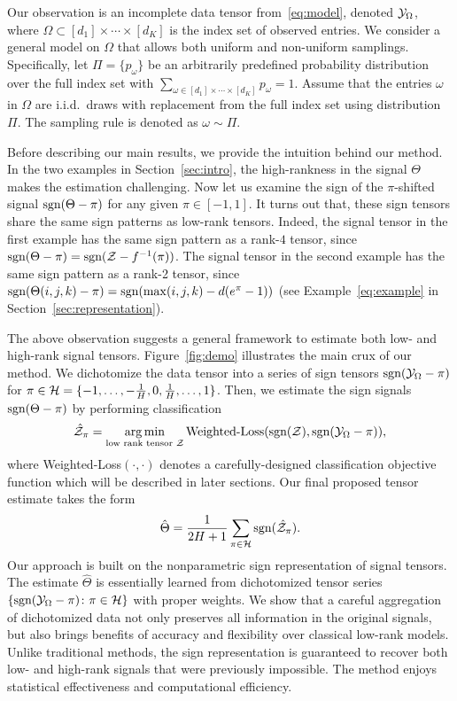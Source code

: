 \documentclass[11pt]{article}
\theoremstyle{plain}
\theoremstyle{definition}
\def\sign{\textup{sgn}}
\begin{document}
Our observation is an incomplete data tensor from~\eqref{eq:model}, denoted  $\mathcal{Y}_\Omega$, where $\Omega\subset[d_1]\times\cdots\times[d_K]$ is the index set of observed entries. We consider a general model on $\Omega$ that allows both uniform and non-uniform samplings. Specifically, let $\Pi=\{p_\omega\}$ be an arbitrarily predefined probability distribution over the full index set with $\sum_{\omega\in[d_1]\times \cdots \times [d_K]}p_\omega=1$. Assume that the entries $\omega$ in $\Omega$ are i.i.d.\ draws with replacement from the full index set using distribution $\Pi$. The sampling rule is denoted as $\omega\sim \Pi$. 

Before describing our main results, we provide the intuition behind our method. In the two examples in Section~\ref{sec:intro}, the high-rankness in the signal $\Theta$ makes the estimation challenging. Now let us examine the sign of the $\pi$-shifted signal $\sign(\Theta-\pi)$ for any given $\pi\in[-1,1]$. It turns out that, these sign tensors share the same sign patterns as low-rank tensors. Indeed, the signal tensor in the first example has the same sign pattern as a rank-$4$ tensor, since $\sign(\Theta-\pi)=\sign(\tZ-f^{-1}(\pi))$. The signal tensor in the second example has the same sign pattern as a rank-2 tensor, since $\sign(\Theta(i,j,k)-\pi)=\sign(\max(i,j,k)-d(e^{\pi}-1))$ (see Example~\ref{eq:example} in Section~\ref{sec:representation}).


The above observation suggests a general framework to estimate both low- and high-rank signal tensors. Figure~\ref{fig:demo} illustrates the main crux of our method. We dichotomize the data tensor into a series of sign tensors $\sign (\tY_\Omega-\pi)$ for $\pi\in \mathcal{H}={\{\small-1,\ldots,  -{1\over H},0, {1\over H},\ldots,1\}}$. Then, we estimate the sign signals $\sign(\Theta-\pi)$ by performing classification
\[
\hat \tZ_\pi=\argmin_{\text{low rank tensor $\tZ$}} \text{Weighted-Loss}(\sign(\tZ), \sign (\tY_\Omega-\pi)),
\]
where Weighted-Loss$(\cdot,\cdot)$ denotes a carefully-designed classification objective function which will be described in later sections. Our final proposed tensor estimate takes the form
\[
\hat \Theta = {1\over 2H+1}\sum_{\pi \in \tH} \sign(\hat \tZ_\pi).
\]
Our approach is built on the nonparametric sign representation of signal tensors. The estimate $\hat \Theta$ is essentially learned from dichotomized tensor series $\{\sign(\tY_\Omega-\pi)\colon \pi \in \tH\}$ with proper weights. We show that a careful aggregation of dichotomized data not only preserves all information in the original signals, but also brings benefits of accuracy and flexibility over classical low-rank models. Unlike traditional methods, the sign representation is guaranteed to recover both low- and high-rank signals that were previously impossible. The method enjoys statistical effectiveness and computational efficiency. 
\end{document}
